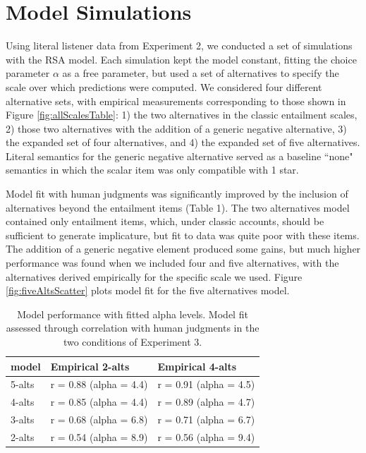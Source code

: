 \documentclass[10pt, letterpaper]{article}
\begin{document}
\section{Model Simulations}\label{model-simulations}

Using literal listener data from Experiment 2, we conducted a set of
simulations with the RSA model. Each simulation kept the model constant,
fitting the choice parameter \(\alpha\) as a free parameter, but used a
set of alternatives to specify the scale over which predictions were
computed. We considered four different alternative sets, with empirical
measurements corresponding to those shown in Figure
\ref{fig:allScalesTable}: 1) the two alternatives in the classic
entailment scales, 2) those two alternatives with the addition of a
generic negative alternative, 3) the expanded set of four alternatives,
and 4) the expanded set of five alternatives. Literal semantics for the
generic negative alternative served as a baseline ``none" semantics in
which the scalar item was only compatible with 1 star.

Model fit with human judgments was significantly improved by the
inclusion of alternatives beyond the entailment items (Table 1). The two
alternatives model contained only entailment items, which, under classic
accounts, should be sufficient to generate implicature, but fit to data
was quite poor with these items. The addition of a generic negative
element produced some gains, but much higher performance was found when
we included four and five alternatives, with the alternatives derived
empirically for the specific scale we used. Figure
\ref{fig:fiveAltsScatter} plots model fit for the five alternatives
model.

\begin{table}[ht]
\centering
\begin{tabular}{lll}
  \hline
model & Empirical 2-alts & Empirical 4-alts \\ 
  \hline
5-alts & r = 0.88 (alpha = 4.4) & r = 0.91 (alpha = 4.5) \\ 
  4-alts & r = 0.85 (alpha = 4.4) & r = 0.89 (alpha = 4.7) \\ 
  3-alts & r = 0.68 (alpha = 6.8) & r = 0.71 (alpha = 6.7) \\ 
  2-alts & r = 0.54 (alpha = 8.9) & r = 0.56 (alpha = 9.4) \\ 
   \hline
\end{tabular}
\caption{Model performance with fitted alpha levels. Model fit assessed through correlation with human judgments in the two conditions of Experiment 3.} 
\end{table}
\end{document}
